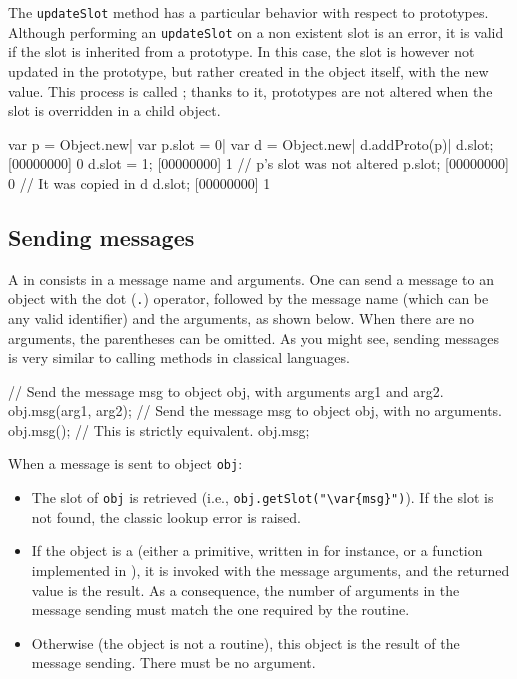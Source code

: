 The \lstinline|updateSlot| method has a particular behavior with
respect to prototypes. Although performing an \lstinline|updateSlot|
on a non existent slot is an error, it is valid if the slot is
inherited from a prototype. In this case, the slot is however not
updated in the prototype, but rather created in the object itself,
with the new value. This process is called ; thanks
to it, prototypes are not altered when the slot is overridden in a
child object.

\begin{urbiscript}[firstnumber=last]
var p = Object.new|
var p.slot = 0|
var d = Object.new|
d.addProto(p)|
d.slot;
[00000000] 0
d.slot = 1;
[00000000] 1
// p's slot was not altered
p.slot;
[00000000] 0
// It was copied in d
d.slot;
[00000000] 1
\end{urbiscript}

\subsection{Sending messages}

A  in \us consists in a message name and arguments. One can
send a message to an object with the dot (\lstinline|.|) operator,
followed by the message name (which can be any valid identifier) and
the arguments, as shown below. When there are no
arguments, the parentheses can be omitted. As you might see,
sending messages is very similar to calling methods in classical
languages.

\begin{urbiunchecked}
// Send the message msg to object obj, with arguments arg1 and arg2.
obj.msg(arg1, arg2);
// Send the message msg to object obj, with no arguments.
obj.msg();
// This is strictly equivalent.
obj.msg;
\end{urbiunchecked}

When a message  is sent to object \lstinline|obj|:

\begin{itemize}
\item The  slot of \lstinline|obj| is retrieved (i.e.,
  \lstinline|obj.getSlot("\var{msg}")|). If the slot is not found, the
  classic lookup error is raised.
\item If the object is a  (either a primitive, written in
  \Cxx for instance, or a function implemented in \us), it is invoked
  with the message arguments, and the returned value is the result. As
  a consequence, the number of arguments in the message sending must
  match the one required by the routine.
\item Otherwise (the object is not a routine), this object is the
  result of the message sending. There must be no argument.
\end{itemize}

